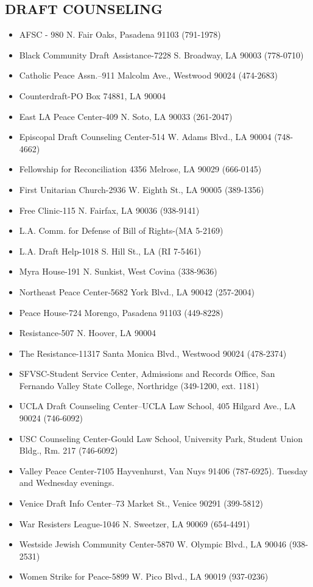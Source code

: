 \documentclass[11pt,twoside,a4paper]{book}
\begin{document}
\subsection{DRAFT COUNSELING}
\begin{itemize}
\item AFSC - 980 N. Fair Oaks, Pasadena 91103 (791-1978) 
\item Black Community  Draft Assistance-7228 S. Broadway, LA 90003 (778-0710) 
\item Catholic Peace Assn.--911 Malcolm Ave., Westwood 90024 (474-2683) 
\item Counterdraft-PO Box 74881, LA 90004 
\item East LA Peace Center-409 N. Soto, LA 90033 (261-2047) 
\item Episcopal Draft Counseling Center-514 W. Adams Blvd., LA 90004 (748-4662) 
\item Fellowship for Reconciliation 4356 Melrose, LA 90029 (666-0145) 
\item First Unitarian Church-2936 W. Eighth St., LA 90005 (389-1356) 
\item Free Clinic-115 N. Fairfax, LA 90036 (938-9141) 
\item L.A. Comm. for Defense of Bill of Rights-(MA 5-2169) 
\item L.A. Draft Help-1018 S. Hill St., LA (RI 7-5461) 
\item Myra House-191 N. Sunkist, West Covina (338-9636) 
\item Northeast Peace Center-5682 York Blvd., LA 90042 (257-2004) 
\item Peace House-724 Morengo, Pasadena 91103 (449-8228) 
\item Resistance-507 N. Hoover, LA 90004 
\item The Resistance-11317 Santa Monica Blvd., Westwood 90024 (478-2374) 
\item SFVSC-Student Service Center, Admissions and Records Office, San Fernando Valley State College, Northridge (349-1200, ext. 1181)
\item UCLA Draft Counseling Center--UCLA Law School, 405 Hilgard Ave., LA 90024 (746-6092) 
\item USC Counseling Center-Gould Law School, University Park, Student Union Bldg., Rm. 217 (746-6092) 
\item Valley Peace Center-7105 Hayvenhurst, Van Nuys 91406 (787-6925). Tuesday and Wednesday evenings. 
\item Venice Draft Info Center--73 Market St., Venice 90291 (399-5812) 
\item War Resisters League-1046 N. Sweetzer, LA 90069 (654-4491) 
\item Westside Jewish Community Center-5870 W. Olympic Blvd., LA 90046 (938-2531) 
\item Women Strike for Peace-5899 W. Pico Blvd., LA 90019 (937-0236)
\end{itemize}
\end{document}
